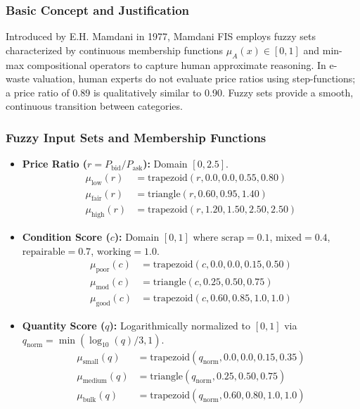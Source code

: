 \documentclass[12pt,a4paper]{article}
\begin{document}
\subsubsection{Basic Concept and Justification}
Introduced by E.H. Mamdani in 1977, Mamdani FIS employs fuzzy sets characterized by continuous membership functions $\mu_A(x) \in [0, 1]$ and min-max compositional operators to capture human approximate reasoning. In e-waste valuation, human experts do not evaluate price ratios using step-functions; a price ratio of 0.89 is qualitatively similar to 0.90. Fuzzy sets provide a smooth, continuous transition between categories.

\subsubsection{Fuzzy Input Sets and Membership Functions}
\begin{itemize}
    \item \textbf{Price Ratio ($r = P_{\text{bid}} / P_{\text{ask}}$):} Domain $[0, 2.5]$.
    \begin{align}
        \mu_{\text{low}}(r) &= \text{trapezoid}(r, 0.0, 0.0, 0.55, 0.80) \\
        \mu_{\text{fair}}(r) &= \text{triangle}(r, 0.60, 0.95, 1.40) \\
        \mu_{\text{high}}(r) &= \text{trapezoid}(r, 1.20, 1.50, 2.50, 2.50)
    \end{align}
    \item \textbf{Condition Score ($c$):} Domain $[0, 1]$ where $\text{scrap}=0.1$, $\text{mixed}=0.4$, $\text{repairable}=0.7$, $\text{working}=1.0$.
    \begin{align}
        \mu_{\text{poor}}(c) &= \text{trapezoid}(c, 0.0, 0.0, 0.15, 0.50) \\
        \mu_{\text{mod}}(c) &= \text{triangle}(c, 0.25, 0.50, 0.75) \\
        \mu_{\text{good}}(c) &= \text{trapezoid}(c, 0.60, 0.85, 1.0, 1.0)
    \end{align}
    \item \textbf{Quantity Score ($q$):} Logarithmically normalized to $[0, 1]$ via $q_{\text{norm}} = \min(\log_{10}(q)/3, 1)$.
    \begin{align}
        \mu_{\text{small}}(q) &= \text{trapezoid}(q_{\text{norm}}, 0.0, 0.0, 0.15, 0.35) \\
        \mu_{\text{medium}}(q) &= \text{triangle}(q_{\text{norm}}, 0.25, 0.50, 0.75) \\
        \mu_{\text{bulk}}(q) &= \text{trapezoid}(q_{\text{norm}}, 0.60, 0.80, 1.0, 1.0)
    \end{align}
\end{itemize}
\end{document}
